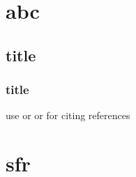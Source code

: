 \documentclass[BTech]{iitmdiss}
\begin{document}
%
%
%
%
%
%




    \chapter{abc}\label{lit}


    \section{title}

    \subsection{title}

    use \citep{r1} or \cite{r2} or \citet{r1} for citing references


    \chapter{sfr}\label{basics}




    \appendix
\end{document}
